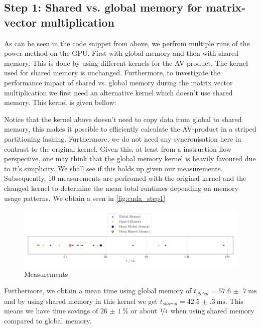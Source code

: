 \subsection{Step 1: Shared vs. global memory for matrix-vector multiplication}
As can be seen in the code snippet from above, we perfrom multiple runs of the power method on the GPU. First with global memory and then with shared memory. This is done by using different kernels for the AV-product. The kernel used for shared memory is unchanged.
Furthermore, to investigate the performance impact of shared vs. global memory during the matrix vector multiplication we first need an alternative kernel which doesn't use shared memory. This kernel is given bellow: 

Notice that the kernel above doesn't need to copy data from global to shared memory, this makes it possible to efficiently calculate the AV-product in a striped partitioning fashing. Furthermore, we do not need any syncronisation here in contrast to the original kernel. Given this, at least from a instruction flow perspective, one may think that the global memory kernel is heavily favoured due to it's simplicity. We shall see if this holds up given our measurements. \\ 
Subsequently, 10 measurements are perfromed with the original kernel and the changed kernel to determine the mean total runtimes depending on memory usage patterns. 
We obtain a  seen in \autoref{fig:cuda_step1}
\begin{figure}[H]
    \centering
    \includegraphics[width=\textwidth]{../fig/lab3/step1.png}
    \caption{Measurements }
    \label{fig:cuda_step1}
\end{figure}
Furthermore, we obtain a mean time using global memory of $t_{global} = \SI{57.6(7)}{\milli\second}$ and by using shared memory in this kernel we get $t_{shared} = \SI{42.5(3)}{\milli\second}$. 
This means we have time savings of $\SI{26(1)}{\percent}$ or about $\nicefrac{1}{4}$ when using shared memory compared to global memory. \\
\\
